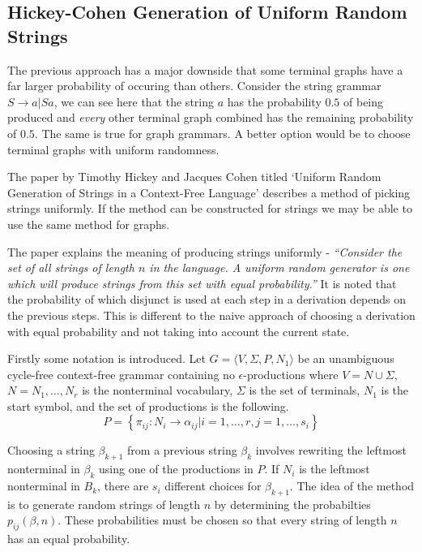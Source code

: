   \subsection{Hickey-Cohen Generation of Uniform Random Strings}

  The previous approach has a major downside that some terminal graphs have a far larger probability of occuring than others. Consider the string grammar $S \to a | Sa$, we can see here that the string $a$ has the probability $0.5$ of being produced and \emph{every} other terminal graph combined has the remaining probability of $0.5$. The same is true for graph grammars. A better option would be to choose terminal graphs with uniform randomness.

  The paper by Timothy Hickey and Jacques Cohen titled `Uniform Random Generation of Strings in a Context-Free Language' describes a method of picking strings uniformly. If the method can be constructed for strings we may be able to use the same method for graphs.

  The paper explains the meaning of producing strings uniformly - \emph{``Consider the set of all strings of length $n$ in the language. A uniform random generator is one which will produce strings from this set with equal probability.''} It is noted that the probability of which disjunct is used at each step in a derivation depends on the previous steps. This is different to the naive approach of choosing a derivation with equal probability and not taking into account the current state.

  Firstly some notation is introduced. Let $G = \langle V, \Sigma, P, N_1 \rangle$ be an unambiguous cycle-free context-free grammar containing no $\epsilon$-productions where $V = N \cup \Sigma$, $N = {N_1,\dots,N_r}$ is the nonterminal vocabulary, $\Sigma$ is the set of terminals, $N_1$ is the start symbol, and the set of productions is the following.
  \[P = \left\{\pi_{ij} : N_i \to \alpha_{ij} | i = 1,\dots,r, j = 1, \dots,s_i \right\}\]

  Choosing a string $\beta_{k+1}$ from a previous string $\beta_k$ involves rewriting the leftmost nonterminal in $\beta_k$ using one of the productions in $P$. If $N_i$ is the leftmost nonterminal in $B_k$, there are $s_i$ different choices for $\beta_{k+1}$. The idea of the method is to generate random strings of length $n$ by determining the probabilties $p_{ij}(\beta, n)$. These probabilities must be chosen so that every string of length $n$ has an equal probability.

